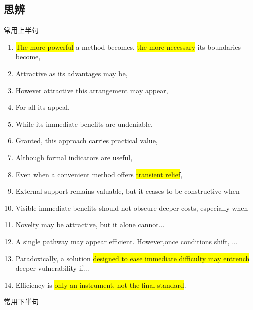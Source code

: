 ﻿\documentclass[lang=cn,11pt]{elegantbook}
\begin{document}
\subsection{思辨}
常用上半句
\begin{enumerate}
\item \colorbox{yellow}{The more powerful} a method becomes, \colorbox{yellow}{the more necessary} its boundaries become,
\item Attractive as its advantages may be,
\item However attractive this arrangement may appear,
\item For all its appeal,
\item While its immediate benefits are undeniable,
\item Granted, this approach carries practical value,
\item Although formal indicators are useful,
\item Even when a convenient method offers \colorbox{yellow}{transient relief},
\item External support remains valuable, but it ceases to be constructive when
\item Visible immediate benefits should not obscure deeper costs, especially when
\item Novelty may be attractive, but it alone cannot...
\item A single pathway may appear efficient. However,once conditions shift, ...
\item Paradoxically, a solution \colorbox{yellow}{designed to ease immediate difficulty may entrench} deeper vulnerability if...
\item Efficiency is \colorbox{yellow}{only an instrument, not the final standard}.
\end{enumerate}
常用下半句
\end{document}
